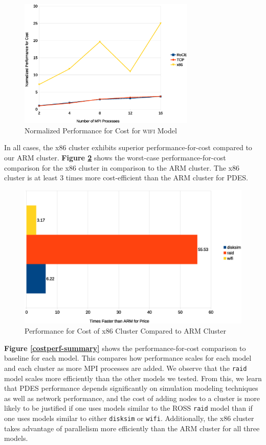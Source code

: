 \documentclass[11pt]{book}
\begin{document}
\begin{figure}
\centering
\includegraphics[width=0.75\textwidth]{wifi_costperf}
\caption{Normalized Performance for Cost for \textsc{wifi} Model}
\label{wifi-costperf}
\end{figure}

In all cases, the x86 cluster exhibits superior performance-for-cost compared to
our ARM cluster. \textbf{Figure \ref{costperf}} shows the worst-case
performance-for-cost comparison for the x86 cluster in comparison to the ARM
cluster. The x86 cluster is at least 3 times more cost-efficient than the ARM
cluster for PDES.

\begin{figure}
\centering
\includegraphics[width=\textwidth]{costperf}
\caption{Performance for Cost of x86 Cluster Compared to ARM Cluster}
\label{costperf}
\end{figure}

\textbf{Figure \ref{costperf-summary}} shows the performance-for-cost comparison
to baseline for each model. This compares how performance scales for each model
and each cluster as more MPI processes are added. We observe that the
\verb;raid; model scales more efficiently than the other models we tested. From
this, we learn that PDES performance depends significantly on simulation
modeling techniques as well as network performance, and the cost of adding nodes
to a cluster is more likely to be justified if one uses models similar to the
ROSS \verb;raid; model than if one uses models similar to either \verb;disksim;
or \verb;wifi;. Additionally, the x86 cluster takes advantage of parallelism
more efficiently than the ARM cluster for all three models.
\end{document}
